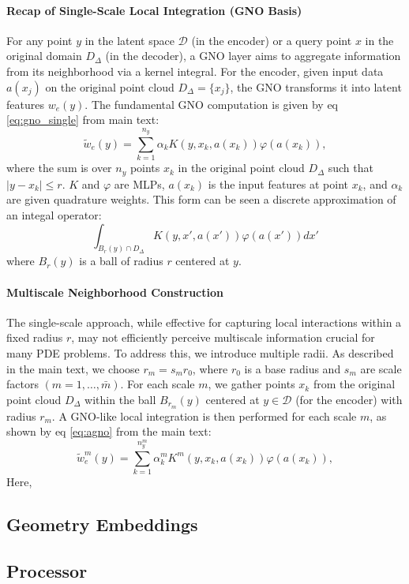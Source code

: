 \documentclass[reqno,10pt]{amsart}
\theoremstyle{plain}
\theoremstyle{definition}
\newcommand{\cal}[1]{\mathcal{#1}}
\begin{document}
\paragraph{\bf Recap of Single-Scale Local Integration (GNO Basis)} For any point $y$ in the latent space $\cal D$ (in the encoder) or a query point $x$ in the original domain $D_\Delta$ (in the decoder), a GNO layer aims to aggregate information from its neighborhood via a kernel integral. For the encoder, given input data $a(x_j)$ on the original point cloud $D_\Delta = \{x_j\}$, the GNO transforms it into latent features $w_e(y)$. The fundamental GNO computation is given by eq \ref{eq:gno_single} from main text:
\begin{equation}
    \tilde{w}_e(y) = \sum_{k=1}^{n_y} \alpha_k K(y,x_k,a(x_k)) \varphi(a(x_k)),
\end{equation}
where the sum is over $n_y$ points $x_k$ in the original point cloud $D_\Delta$ such that $|y-x_k| \leq r$. $K$ and $\varphi$ are MLPs, $a(x_k)$ is the input features at point $x_k$, and $\alpha_k$ are given quadrature weights. This form can be seen a discrete approximation of an integal operator:
\begin{equation}
\int_{B_r(y) \cap D_\Delta} K(y,x',a(x')) \varphi(a(x')) dx'
\end{equation}
where $B_r(y)$ is a ball of radius $r$ centered at $y$.
\paragraph{\bf Multiscale Neighborhood Construction} The single-scale approach, while effective for capturing local interactions within a fixed radius $r$, may not efficiently perceive multiscale information crucial for many PDE problems. To address this, we introduce multiple radii. As described in the main text, we choose $r_m = s_mr_0$, where $r_0$ is a base radius and $s_m$ are scale factors $(m = 1, \dots, \bar{m})$. For each scale $m$, we gather points $x_k$ from the original point cloud $D_\Delta$ within the ball $B_{r_m}(y)$ centered at $y \in \cal D$ (for the encoder) with radius $r_m$. A GNO-like local integration is then performed for each scale $m$, as shown by eq \ref{eq:agno} from the main text:
\begin{equation}
    \tilde{w}_e^m (y) = \sum_{k=1}^{n_y^m} \alpha_k^m K^m (y,x_k,a(x_k)) \varphi(a(x_k)),
\end{equation}
Here, 


\subsection{\bf Geometry Embeddings} \label{appendix:gembedd}


\subsection{\bf Processor} \label{appendix:processor}




\end{document}
